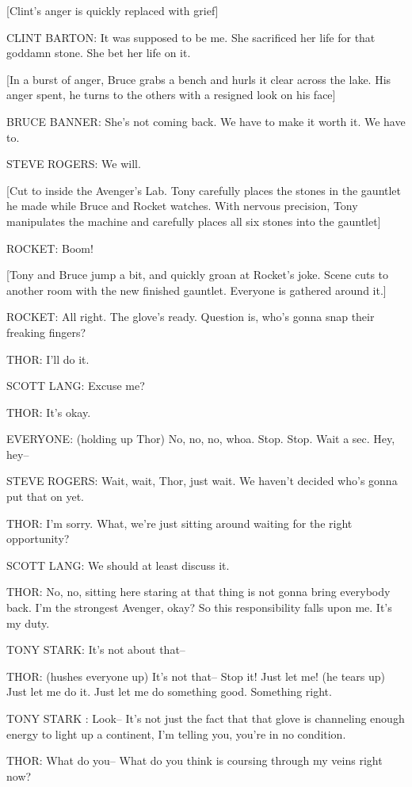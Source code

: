 [Clint's anger is quickly replaced with grief]

CLINT BARTON: It was supposed to be me. She sacrificed her life for that goddamn stone. She bet her life on it.

[In a burst of anger, Bruce grabs a bench and hurls it clear across the lake. His anger spent, he turns to the others with a resigned look on his face]

BRUCE BANNER: She's not coming back. We have to make it worth it. We have to.

STEVE ROGERS: We will.

[Cut to inside the Avenger's Lab. Tony carefully places the stones in the gauntlet he made while Bruce and Rocket watches. With nervous precision, Tony manipulates the machine and carefully places all six stones into the gauntlet]

ROCKET: Boom!

[Tony and Bruce jump a bit, and quickly groan at Rocket's joke. Scene cuts to another room with the new finished gauntlet. Everyone is gathered around it.]

ROCKET: All right. The glove's ready. Question is, who's gonna snap their freaking fingers?

THOR: I'll do it.

SCOTT LANG: Excuse me?

THOR: It's okay.

EVERYONE: (holding up Thor) No, no, no, whoa. Stop. Stop. Wait a sec. Hey, hey–

STEVE ROGERS: Wait, wait, Thor, just wait. We haven't decided who's gonna put that on yet.

THOR: I'm sorry. What, we're just sitting around waiting for the right opportunity?

SCOTT LANG: We should at least discuss it.

THOR: No, no, sitting here staring at that thing is not gonna bring everybody back. I'm the strongest Avenger, okay? So this responsibility falls upon me. It's my duty.

TONY STARK: It's not about that–

THOR: (hushes everyone up) It's not that– Stop it! Just let me! (he tears up) Just let me do it. Just let me do something good. Something right.

TONY STARK : Look– It's not just the fact that that glove is channeling enough energy to light up a continent, I'm telling you, you're in no condition.

THOR: What do you– What do you think is coursing through my veins right now?

